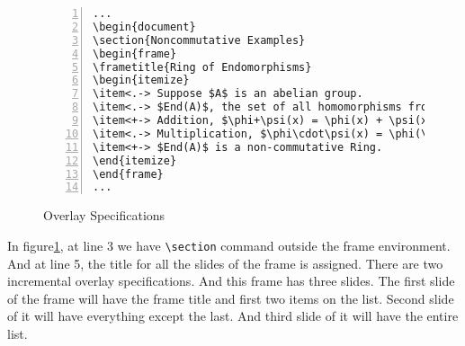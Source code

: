 \documentclass{article}
\begin{document}
\begin{figure}[h]
\centering
\begin{Verbatim}[numbers = left]
...
\begin{document}
\section{Noncommutative Examples}
\begin{frame}
\frametitle{Ring of Endomorphisms}
\begin{itemize}
\item<.-> Suppose $A$ is an abelian group.
\item<.-> $End(A)$, the set of all homomorphisms from $A$ into $A$
\item<+-> Addition, $\phi+\psi(x) = \phi(x) + \psi(x)$
\item<.-> Multiplication, $\phi\cdot\psi(x) = \phi(\psi(x))$
\item<+-> $End(A)$ is a non-commutative Ring.
\end{itemize}
\end{frame}
...
\end{Verbatim}
\caption{Overlay Specifications}
\label{fig:overlay}
\end{figure}

	In figure\ref{fig:overlay}, at line 3 we have \texttt{\textbackslash section} command outside the frame environment. And at line 5, the title for all the slides of the frame is assigned. There are two incremental overlay specifications. And this frame has three slides. The first slide of the frame will have the frame title and first two items on the list. Second slide of it  will have everything except the last. And third slide of it will have the entire list.
	
\end{document}
